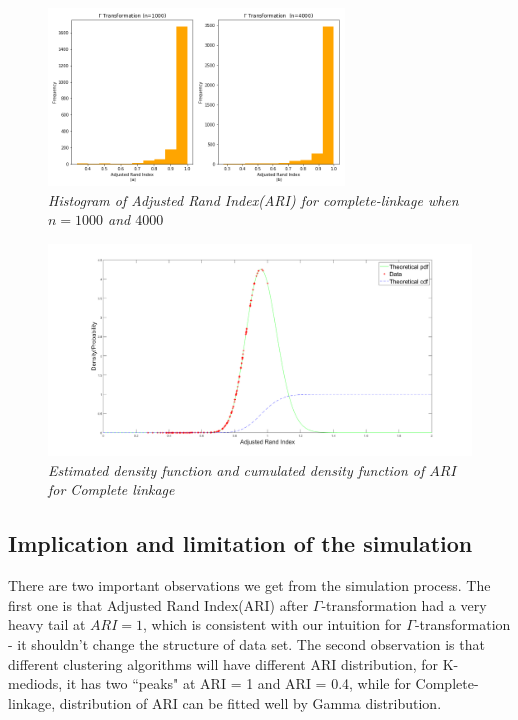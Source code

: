 \documentclass{uonmathreport}
\begin{document}
\begin{figure}[H]
 \begin{center}
   \includegraphics[width=0.7\textwidth]{simulate2_1.png}
 \end{center}
 \caption{\textit{Histogram of Adjusted Rand Index(ARI) for complete-linkage when $n=1000$ and $4000$ }}
 \label{fig:single-linkage}
\end{figure}

\begin{figure}[H]
 \begin{center}
   \includegraphics[width=1\textwidth]{Complete-linkage-cdf.png}
 \end{center}
 \caption{\textit{Estimated density function and cumulated density function of $ARI$ for Complete linkage}}
 \label{fig:single-linkage2}
\end{figure}

\subsection{Implication and limitation of the simulation} \label{subsec: simulationSum}
There are two important observations we get from the simulation process. The first one is that Adjusted Rand Index(ARI) after $\Gamma$-transformation had a very heavy tail at $ARI=1$, which is consistent with our intuition for $\Gamma$-transformation - it shouldn't change the structure of data set. The second observation is that different clustering algorithms will have different ARI distribution, for K-mediods, it has two 	``peaks" at ARI = 1 and ARI = 0.4, while for Complete-linkage, distribution of ARI can be fitted well by Gamma distribution. 
\end{document}
